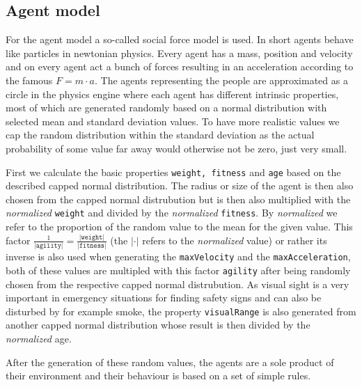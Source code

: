 \documentclass[11pt]{article}
\begin{document}
\subsection{Agent model}
For the agent model a so-called social force model is used. In short agents behave like particles in newtonian physics. Every agent has a mass, position and velocity and on every agent act a bunch of forces resulting in an acceleration according to the famous $F=m\cdot a$. The agents representing the people are approximated as a circle in the physics engine where each agent has different intrinsic properties, most of which are generated randomly based on a normal distribution with selected mean and standard deviation values. To have more realistic values we cap the random distribution within the standard deviation as the actual probability of some value far away would otherwise not be zero, just very small.

First we calculate the basic properties \texttt{weight, fitness} and \texttt{age} based on the described capped normal distribution. The radius or size of the agent is then also chosen from the capped normal distrubution but is then also multiplied with the \textit{normalized} \texttt{weight} and divided by the \textit{normalized} \texttt{fitness}. By \textit{normalized} we refer to the proportion of the random value to the mean for the given value. This factor $\frac{1}{\texttt{|agility|}} = \frac{\texttt{|weight|}}{\texttt{|fitness|}}$ (the $|\cdot|$ refers to the \textit{normalized} value) or rather its inverse is also used when generating the \texttt{maxVelocity} and the \texttt{maxAcceleration}, both of these values are multipled with this factor \texttt{agility} after being randomly chosen from the respective capped normal distrubution. As visual sight is a very important in emergency situations for finding safety signs and can also be disturbed by for example smoke, the property \texttt{visualRange} is also generated from another capped normal distribution whose result is then divided by the \textit{normalized} age.

After the generation of these random values, the agents are a sole product of their environment and their behaviour is based on a set of simple rules.
\end{document}
